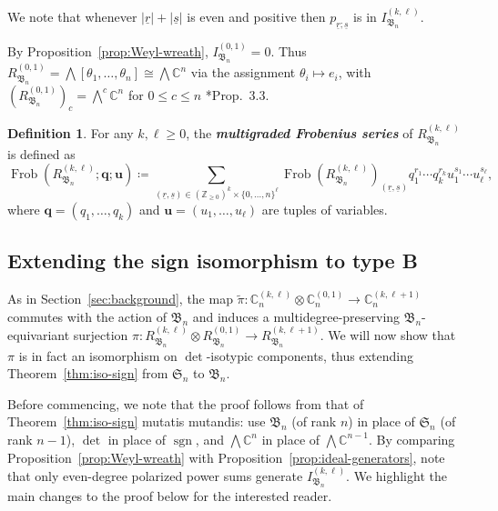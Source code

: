 \documentclass[11pt, reqno]{amsart}
\theoremstyle{definition}
\newtheorem{definition}[theorem]{Definition}
\theoremstyle{remark}
\numberwithin{equation}{section}
\newcommand{\0}{\emptyset}
\newcommand{\C}{\mathbb{C}}
\renewcommand{\S}{\mathfrak{S}}
\renewcommand{\r}{\underline{r}}
\newcommand{\s}{\underline{s}}
\DeclareMathOperator{\Frob}{Frob}
\DeclareMathOperator{\sgn}{sgn}
\newcommand{\newword}[1]{\emph{\textbf{#1}}}
\begin{document}
We note that whenever $|\r| + |\s|$ is even and positive then 
$p_{\r;\s}$ is in $I_{\mathfrak{B}_n}^{(k,\ell)}$.

By Proposition~\ref{prop:Weyl-wreath}, $I_{\mathfrak{B}_n}^{(0,1)} = 0$. 
Thus $R_{\mathfrak{B}_n}^{(0,1)} = \bigwedge[\theta_1, \ldots, \theta_n] \cong \bigwedge \C^n$ via the assignment $\theta_i \mapsto e_i$, with $\left(R_{\mathfrak{B}_n}^{(0,1)}\right)_c = \bigwedge^c \C^n$ for $0 \leq c\leq n$ \cite{JiangLentfer}*{Prop.~3.3}.

\begin{definition} For any $k,\ell \geq 0$, the \newword{multigraded Frobenius series} of $R_{\mathfrak{B}_n}^{(k,\ell)}$ is defined as
    \[
        \Frob\left(R_{\mathfrak{B}_n}^{(k,\ell)}; \mathbf{q}; \mathbf{u}\right) \coloneqq 
        \sum_{(\r, \s) 
        \in (\mathbb{Z}_{\geq 0})^{k} \times \{0,\ldots,n\}^{\ell}}
        \Frob\left(R_{\mathfrak{B}_n}^{(k,\ell)}\right)_{(\r, \s)} 
        q_1^{r_1}\cdots q_k^{r_k} u_1^{s_1}\cdots u_\ell^{s_\ell}, 
    \]
    where $\mathbf{q} = (q_1, \ldots, q_k)$ and $\mathbf{u} = (u_1, \ldots, u_{\ell})$
    are tuples of variables.
\end{definition}

\subsection{Extending the sign isomorphism to type B}\label{subsec:type-B-main}

As in Section~\ref{sec:background}, the map $\tilde{\pi}: \C^{(k,\ell)}_n \otimes \C^{(0,1)}_n \to \C^{(k,\ell+1)}_n$
commutes with the action of $\mathfrak{B}_n$ and induces a multidegree-preserving $\mathfrak{B}_n$-equivariant surjection $\pi:R_{\mathfrak{B}_n}^{(k,\ell)} \otimes R_{\mathfrak{B}_n}^{(0,1)} \to R_{\mathfrak{B}_n}^{(k,\ell+1)}$. We will now show that $\pi$ is in fact an isomorphism on $\det$-isotypic components, thus extending Theorem~\ref{thm:iso-sign} from $\S_n$ to $\mathfrak{B}_n$. 

Before commencing, we note that the proof follows from that of 
Theorem~\ref{thm:iso-sign} mutatis mutandis: use $\mathfrak{B}_n$ (of rank $n$) 
in place of $\mathfrak{S}_n$ (of rank $n-1$), $\det$ in place of $\sgn$, 
and $\bigwedge\C^n$ in place of $\bigwedge\C^{n-1}$.
By comparing Proposition~\ref{prop:Weyl-wreath} with 
Proposition~\ref{prop:ideal-generators}, note that only even-degree 
polarized power sums generate $I_{\mathfrak{B}_n}^{(k,\ell)}$. 
We highlight the main changes to the proof below for the interested reader.
\end{document}

